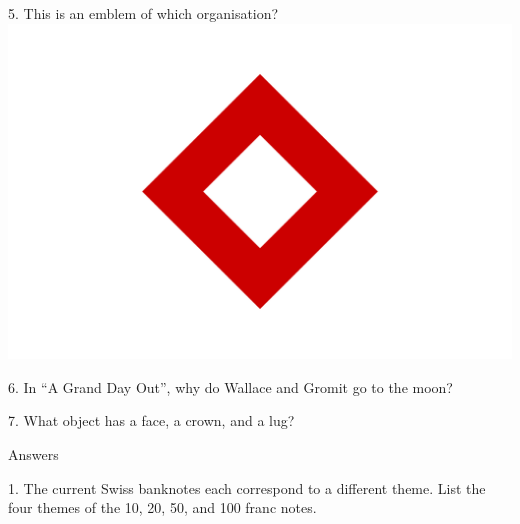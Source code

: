 \begin{frame}
\begin{center}
\Large
5. This is an emblem of which organisation?
\\
\vspace{0.5em}\includegraphics[height=0.6\paperheight]{images/red_crystal.png}
\end{center}
\end{frame}
\begin{frame}
\begin{center}
\Large
6. In ``A Grand Day Out'', why do Wallace and Gromit go to the moon?
\end{center}
\end{frame}
\begin{frame}
\begin{center}
\Large
7. What object has a face, a crown, and a lug?
\end{center}
\end{frame}
\begin{frame}

\end{frame}
\begin{frame}
\begin{center}
\Huge
Answers
\end{center}
\end{frame}
\begin{frame}
\begin{center}
\Large
1. The current Swiss banknotes each correspond to a different theme. List the four themes of the 10, 20, 50, and 100 franc notes.
\\
\end{center}
\end{frame}
